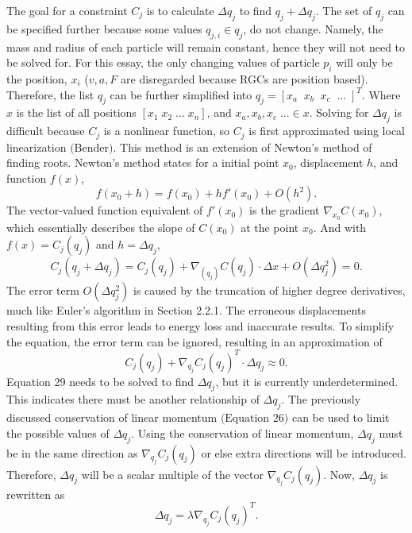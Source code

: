 \documentclass[12pt, letterpaper]{article}
\begin{document}
The goal for a constraint $C_j$ is to calculate $\Delta q_j$ to find $q_j + \Delta q_j$. The set of $q_j$ can be specified further because some values $q_{j,i} \in q_j$, do not change. Namely, the mass and radius of each particle will remain constant, hence they will not need to be solved for. For this essay, the only changing values of particle $p_i$ will only be the position, $x_i$ ($v, a, F$ are disregarded because RGCs are position based).  Therefore, the list $q_j$ can be further simplified into $q_j = [x_a\;\;x_b\;\;x_c\;\;...\;]^T.$ Where $x$ is the list of all positions $[x_1 \;x_2 \; ...\;x_n]$, and $x_a,x_b,x_c\;... \in x$. Solving for $\Delta q_j$ is difficult because $C_j$ is a nonlinear function, so $C_j$ is first approximated using local linearization $\text{(Bender)}$. This method is an extension of Newton's method of finding roots. Newton's method states for a initial point $x_0$, displacement $h$, and function $f(x)$,
$$f(x_0 + h) = f(x_0) + hf'(x_0) + O(h^2).$$
The vector-valued function equivalent of $f'(x_0)$ is the gradient $\nabla_{x_0} C(x_0)$, which essentially describes the slope of $C(x_0)$ at the point $x_0$. And with $f(x) = C_j(q_j)$ and $h = \Delta q_j$,
\begin{equation}
    C_j(q_j + \Delta q_j) = C_j(q_j) + \nabla_{(q_j)}C(q_j) \cdot \Delta x + O(\Delta q_j^{2}) = 0.
\end{equation}
The error term $O(\Delta q_j^{2})$ is caused by the truncation of higher degree derivatives, much like Euler's algorithm in Section 2.2.1. The erroneous displacements resulting from this error leads to energy loss and inaccurate results. To simplify the equation, the error term can be ignored, resulting in an approximation of
\begin{equation}
    C_j(q_j) + \nabla_{q_j} C_j(q_j)^{T} \cdot \Delta q_j \approx 0.
\end{equation}
Equation 29 needs to be solved to find $\Delta q_j$, but it is currently underdetermined. This indicates there must be another relationship of $\Delta q_j$. The previously discussed conservation of linear momentum $\text{(Equation 26)}$ can be used to limit the possible values of $\Delta q_j$. Using the conservation of linear momentum, $\Delta q_j$ must be in the same direction as  $\nabla_{q_j}C_j(q_j)$ or else extra directions will be introduced. Therefore, $\Delta q_j$ will be a scalar multiple of the vector $\nabla_{q_j}C_j(q_j)$. Now, $\Delta q_j$ is rewritten as
\begin{equation}
   \Delta q_j = \lambda \nabla_{q_j}C_j(q_j)^{T}.
\end{equation}
\end{document}
